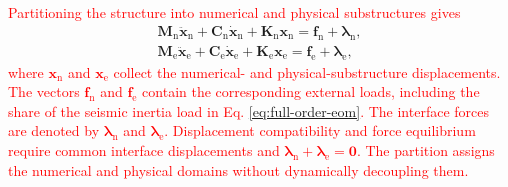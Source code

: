 \documentclass[11pt,a4paper]{article}
\numberwithin{equation}{section}
\newcommand{\rev}[1]{\textcolor{red}{#1}}
\begin{document}
\rev{Partitioning the structure into numerical and physical substructures gives}
\begin{subequations}
	\label{eq:substructure-eom}
	\begin{align}
		\mathbf{M}_{\mathrm{n}}\ddot{\bm{x}}_{\mathrm{n}}
		+\mathbf{C}_{\mathrm{n}}\dot{\bm{x}}_{\mathrm{n}}
		+\mathbf{K}_{\mathrm{n}}\bm{x}_{\mathrm{n}}
		=\bm{f}_{\mathrm{n}}{}+\bm{\lambda}_{\mathrm{n}},
		\label{eq:numerical-eom}\\
		\mathbf{M}_{\mathrm{e}}\ddot{\bm{x}}_{\mathrm{e}}
		+\mathbf{C}_{\mathrm{e}}\dot{\bm{x}}_{\mathrm{e}}
		+\mathbf{K}_{\mathrm{e}}\bm{x}_{\mathrm{e}}
		=\bm{f}_{\mathrm{e}}{}+\bm{\lambda}_{\mathrm{e}},
		\label{eq:physical-eom}
	\end{align}
\end{subequations}
\rev{where \(\bm{x}_{\mathrm{n}}\) and \(\bm{x}_{\mathrm{e}}\) collect the numerical- and physical-substructure displacements. The vectors \(\bm{f}_{\mathrm{n}}\) and \(\bm{f}_{\mathrm{e}}\) contain the corresponding external loads, including the share of the seismic inertia load in Eq. \eqref{eq:full-order-eom}. The interface forces are denoted by \(\bm{\lambda}_{\mathrm{n}}\) and \(\bm{\lambda}_{\mathrm{e}}\). Displacement compatibility and force equilibrium require common interface displacements and \(\bm{\lambda}_{\mathrm{n}}+\bm{\lambda}_{\mathrm{e}}=\bm{0}\). The partition assigns the numerical and physical domains without dynamically decoupling them.}
\end{document}
